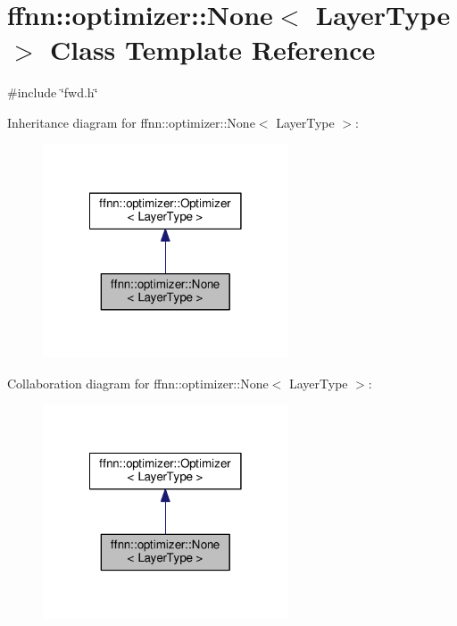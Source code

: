 \hypertarget{classffnn_1_1optimizer_1_1_none}{\section{ffnn\-:\-:optimizer\-:\-:None$<$ Layer\-Type $>$ Class Template Reference}
\label{classffnn_1_1optimizer_1_1_none}
}


{\ttfamily \#include \char`\"{}fwd.\-h\char`\"{}}



Inheritance diagram for ffnn\-:\-:optimizer\-:\-:None$<$ Layer\-Type $>$\-:
\nopagebreak
\begin{figure}[H]
\begin{center}
\leavevmode
\includegraphics[width=206pt]{classffnn_1_1optimizer_1_1_none__inherit__graph}
\end{center}
\end{figure}


Collaboration diagram for ffnn\-:\-:optimizer\-:\-:None$<$ Layer\-Type $>$\-:
\nopagebreak
\begin{figure}[H]
\begin{center}
\leavevmode
\includegraphics[width=206pt]{classffnn_1_1optimizer_1_1_none__coll__graph}
\end{center}
\end{figure}
